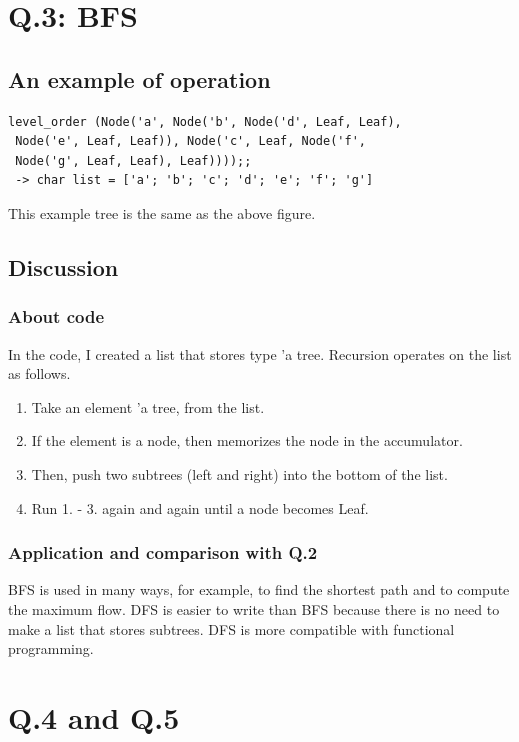 \documentclass[uplatex,12pt]{jsarticle}
\begin{document}
\section{Q.3: BFS}

\subsection{An example of operation}
\begin{lstlisting}[caption=test code]
level_order (Node('a', Node('b', Node('d', Leaf, Leaf),
 Node('e', Leaf, Leaf)), Node('c', Leaf, Node('f',
 Node('g', Leaf, Leaf), Leaf))));;
 -> char list = ['a'; 'b'; 'c'; 'd'; 'e'; 'f'; 'g']
\end{lstlisting}

This example tree is the same as the above figure.
\vspace{12pt}
\subsection{Discussion}
\subsubsection{About code}
In the code, I created a list that stores type 'a tree. Recursion operates on the list as follows.
\begin{enumerate}
  \item Take an element 'a tree, from the list.
  \item If the element is a node, then memorizes the node in the accumulator.
  \item Then, push two subtrees (left and right) into the bottom of the list.
  \item Run 1. - 3. again and again until a node becomes Leaf.
\end{enumerate}

\subsubsection{Application and comparison with Q.2}
BFS is used in many ways, for example, to find the shortest path and to compute the maximum flow. DFS is easier to write than BFS because there is no need to make a list that stores subtrees. DFS is more compatible with functional programming.


\section{Q.4 and Q.5}
\end{document}
